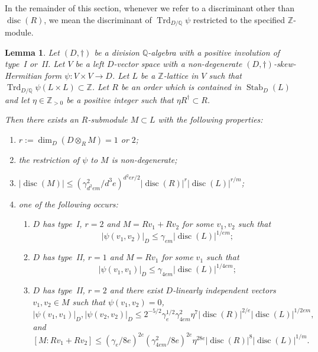 \documentclass[JEP,XML,SOM,Unicode,NoFloatCountersInSection]{cedram}
\newenvironment{enumeratei}
{\bgroup\def\theenumi{\roman{enumi}}\def\theenumii{\alph{enumii}}\begin{enumerate}}
{\end{enumerate}\egroup}
\newcommand{\bQ}{\mathbb{Q}}
\newcommand{\bZ}{\mathbb{Z}}
\DeclareMathOperator{\disc}{disc}
\DeclareMathOperator{\Stab}{Stab}
\DeclareMathOperator{\Trd}{Trd}
\newcommand{\abs}[1]{\lvert #1 \rvert}
\newtheorem{lemma}{Lemma}[section]
\begin{document}
In the remainder of this section, whenever we refer to a discriminant other than $\disc(R)$, we mean the discriminant of $\Trd_{D/\bQ} \psi$ restricted to the specified $\bZ$-module.

\begin{lemma} \label{pre-induction}
Let $(D,\dag)$ be a division $\bQ$-algebra with a positive involution of type~I or~II.
Let $V$ be a left $D$-vector space with a non-degenerate $(D,\dag)$-skew-Hermitian form $\psi \colon V \times V \to D$.
Let $L$ be a $\bZ$-lattice in $V$ such that $\Trd_{D/\bQ} \psi(L \times L) \subset \bZ$.
Let $R$ be an order which is contained in $\Stab_D(L)$ and let $\eta \in \bZ_{>0}$ be a positive integer such that $\eta R^\dag \subset R$.

Then there exists an $R$-submodule $M \subset L$ with the following properties:
\begin{enumeratei}
\item\label{pre-inductioni} $r := \dim_D(D \otimes_R M) = 1$ or $2$;
\item\label{pre-inductionii} the restriction of $\psi$ to $M$ is non-degenerate;
\item\label{pre-inductioniii} $\abs{\disc(M)} \leq (\gamma_{d^2em}^2/d^3e)^{d^2er/2} \abs{\disc(R)}^r \abs{\disc(L)}^{r/m}$;
\item\label{pre-inductioniv} one of the following occurs:
\begin{enumerate}
\item $D$ has type~I, $r=2$ and $M = Rv_1 + Rv_2$ for some $v_1, v_2$ such that\vspace*{-3pt}
\[
\abs{\psi(v_1, v_2)}_D \leq \gamma_{em} \abs{\disc(L)}^{1/em};
\]
\item $D$ has type~II, $r=1$ and $M = Rv_1$ for some $v_1$ such that\vspace*{-3pt}
\[
\abs{\psi(v_1, v_1)}_D \leq \gamma_{4em} \abs{\disc(L)}^{1/4em};
\]
\item $D$ has type~II, $r=2$ and there exist $D$-linearly independent vectors $v_1, v_2 \in M$ such that $\psi(v_1, v_2) = 0$,\vspace*{-3pt}\enlargethispage{\baselineskip}
\[
\abs{\psi(v_1, v_1)}_D, \abs{\psi(v_2, v_2)}_D \leq 2^{-5/2} \gamma_e^{1/2} \gamma_{4em}^2 \eta^7 \abs{\disc(R)}^{2/e} \abs{\disc(L)}^{1/2em},
\]
and\vspace*{-5pt}
\[
[M:Rv_1 + Rv_2] \leq (\gamma_e/8e)^{2e} (\gamma_{4em}^2/8e)^{2e} \eta^{28e} \abs{\disc(R)}^8 \abs{\disc(L)}^{1/m}.
\]
\end{enumerate}
\end{enumeratei}
\end{lemma}
\end{document}
